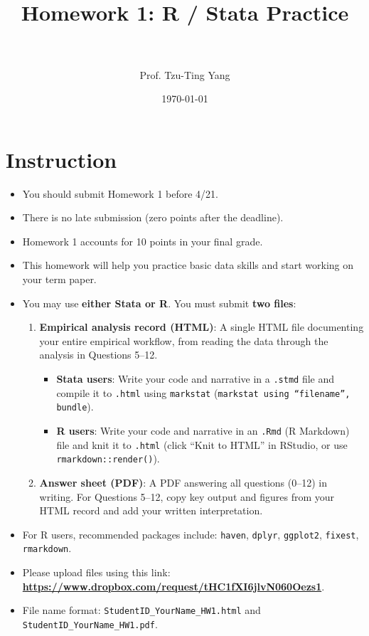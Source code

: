 \documentclass[paper=a4, fontsize=11pt]{scrartcl}
\title{
\normalfont \normalsize
\horrule{0.5pt} \\[0.4cm]
\huge Homework 1: R / Stata Practice \\
\horrule{2pt} \\[0.5cm]
}
\author{Prof. Tzu-Ting Yang}
\date{\normalsize\today}
\begin{document}
\maketitle


\section*{Instruction}
\begin{itemize}
\item[\textbullet] You should submit Homework 1 before 4/21.
\item[\textbullet] There is no late submission (zero points after the deadline).
\item[\textbullet] Homework 1 accounts for 10 points in your final grade.
\item[\textbullet] This homework will help you practice basic data skills and start working on your term paper.
\item[\textbullet] You may use \textbf{either Stata or R}. You must submit \textbf{two files}:
\begin{enumerate}
  \item \textbf{Empirical analysis record (HTML)}: A single HTML file documenting your entire empirical workflow, from reading the data through the analysis in Questions 5--12.
  \begin{itemize}
    \item \textbf{Stata users}: Write your code and narrative in a \texttt{.stmd} file and compile it to \texttt{.html} using \texttt{markstat} (\texttt{markstat using ``filename'', bundle}).
    \item \textbf{R users}: Write your code and narrative in an \texttt{.Rmd} (R Markdown) file and knit it to \texttt{.html} (click ``Knit to HTML'' in RStudio, or use \texttt{rmarkdown::render()}).
  \end{itemize}
  \item \textbf{Answer sheet (PDF)}: A PDF answering all questions (0--12) in writing. For Questions 5--12, copy key output and figures from your HTML record and add your written interpretation.
\end{enumerate}
\item[\textbullet] For R users, recommended packages include: \texttt{haven}, \texttt{dplyr}, \texttt{ggplot2}, \texttt{fixest}, \texttt{rmarkdown}.
\item[\textbullet] Please upload files using this link: \\ \textbf{\url{https://www.dropbox.com/request/tHC1fXI6jlvN060Oezs1}}.
\item[\textbullet] File name format: \texttt{StudentID\_YourName\_HW1.html} and \texttt{StudentID\_YourName\_HW1.pdf}.
\end{itemize}
\end{document}
